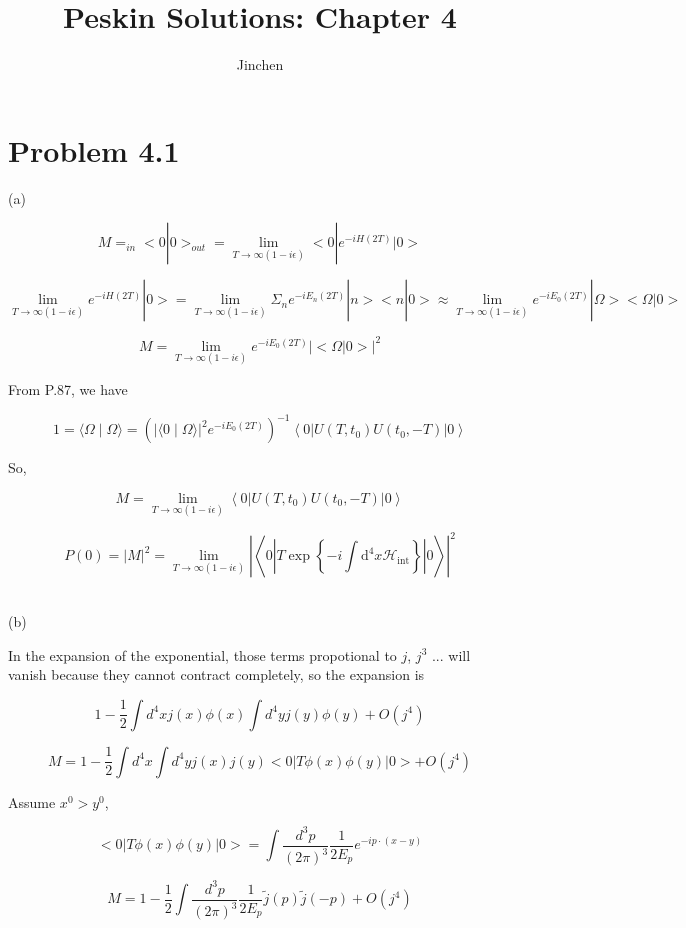\documentclass[11pt]{article} %
\title{Peskin Solutions: Chapter 4}
\author{Jinchen}
\begin{document}
\maketitle

\section{Problem 4.1}

\noindent (a)

\[
    M =  _{in}<0|0>_{out} = \lim_{T \to \infty(1-i\epsilon)} <0|e^{-i H (2T)}|0>        
\]

\[
    \lim_{T \to \infty(1-i\epsilon)} e^{-i H (2T)}|0> = \lim_{T \to \infty(1-i\epsilon)} \Sigma_{n} e^{-i E_n (2T)} |n><n|0> \approx \lim_{T \to \infty(1-i\epsilon)} e^{-i E_0 (2T)} |\Omega><\Omega|0>
\]

\[
    M = \lim_{T \to \infty(1-i\epsilon)} e^{-i E_0 (2T)} |<\Omega|0>|^2    
\]

From P.87, we have

\[
    1=\langle\Omega \mid \Omega\rangle=\left(|\langle 0 \mid \Omega\rangle|^{2} e^{-i E_{0}(2 T)}\right)^{-1}\left\langle 0\left|U\left(T, t_{0}\right) U\left(t_{0},-T\right)\right| 0\right\rangle    
\]

So,

\[
    M = \lim_{T \to \infty(1-i\epsilon)} \left\langle 0\left|U\left(T, t_{0}\right) U\left(t_{0},-T\right)\right| 0\right\rangle 
\]

\[
    P(0) = |M|^2 = \lim_{T \to \infty(1-i\epsilon)} \left|\left\langle 0\left|T \exp \left\{-i \int \mathrm{d}^{4} x \mathcal{H}_{\mathrm{int}}\right\}\right| 0\right\rangle\right|^{2}    
\]

~\\
\noindent (b)

In the expansion of the exponential, those terms propotional to $j$, $j^3$ ... will vanish because they cannot contract completely, so the expansion is

\[
    1 - \frac{1}{2} \int d^4 x j(x) \phi(x) \int d^4 y j(y) \phi(y) + O(j^4)
\]

\[
    M = 1 - \frac{1}{2} \int d^4 x \int d^4 y j(x) j(y) <0|T{\phi(x) \phi(y)}|0> + O(j^4)
\]

Assume $x^0 > y^0$, 

\[
    <0|T{\phi(x) \phi(y)}|0> = \int \frac{d^3 p}{(2\pi)^3} \frac{1}{2 E_p} e^{-ip\cdot(x-y)}
\]

\[
    M = 1 - \frac{1}{2} \int \frac{d^3 p}{(2\pi)^3} \frac{1}{2 E_p} \tilde{j}(p) \tilde{j}(-p) + O(j^4)   
\]
\end{document}
